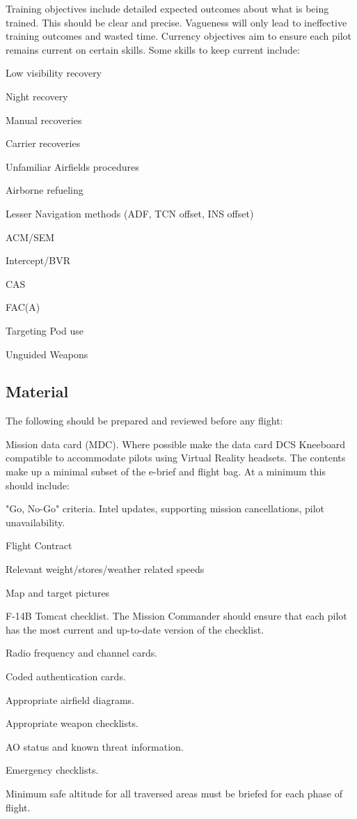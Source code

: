 Training objectives include detailed expected outcomes about what is being
trained. This should be clear and precise. Vagueness will only lead to
ineffective training outcomes and wasted time. Currency objectives aim to
ensure each pilot remains current on certain skills. Some skills to keep
current include:

\begin{subsectionenumerate}
  \item Low visibility recovery
  \item Night recovery
  \item Manual recoveries
  \item Carrier recoveries
  \item Unfamiliar Airfields procedures
  \item Airborne refueling
  \item Lesser Navigation methods (ADF, TCN offset, INS offset)
  \item ACM/SEM
  \item Intercept/BVR
  \item CAS
  \item FAC(A)
  \item Targeting Pod use
  \item Unguided Weapons
\end{subsectionenumerate}

\subsection{Material}

The following should be prepared and reviewed before any flight:

Mission data card (MDC). Where possible make the data card DCS Kneeboard
compatible to accommodate pilots using Virtual Reality headsets. The contents
make up a minimal subset of the e-brief and flight bag. At a minimum this
should include:

\begin{subsectionenumerate}
  \item "Go, No-Go" criteria. Intel updates, supporting mission cancellations,
    pilot unavailability.
  \item Flight Contract
  \item Relevant weight/stores/weather related speeds
  \item Map and target pictures
  \item F-14B Tomcat checklist. The Mission Commander should ensure that each
    pilot has the most current and up-to-date version of the checklist.
  \item Radio frequency and channel cards.
  \item Coded authentication cards.
  \item Appropriate airfield diagrams.
  \item Appropriate weapon checklists.
  \item AO status and known threat information.
  \item Emergency checklists.
  \item Minimum safe altitude for all traversed areas must be briefed for each
    phase of flight.
\end{subsectionenumerate}


